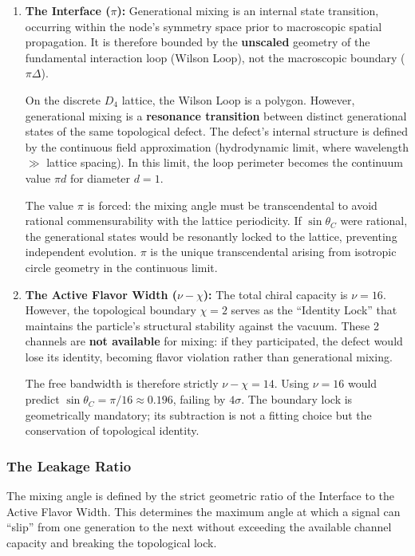 \begin{enumerate}
    \item \textbf{The Interface ($\pi$):} Generational mixing is an internal state transition, occurring within the node's symmetry space prior to macroscopic spatial propagation. It is therefore bounded by the \textbf{unscaled} geometry of the fundamental interaction loop (Wilson Loop), not the macroscopic boundary ($\pi\Delta$).

    On the discrete $D_4$ lattice, the Wilson Loop is a polygon. However, generational mixing is a \textbf{resonance transition} between distinct generational states of the same topological defect. The defect's internal structure is defined by the continuous field approximation (hydrodynamic limit, where wavelength $\gg$ lattice spacing). In this limit, the loop perimeter becomes the continuum value $\pi d$ for diameter $d=1$.

    The value $\pi$ is forced: the mixing angle must be transcendental to avoid rational commensurability with the lattice periodicity. If $\sin\theta_C$ were rational, the generational states would be resonantly locked to the lattice, preventing independent evolution. $\pi$ is the unique transcendental arising from isotropic circle geometry in the continuous limit.

    \item \textbf{The Active Flavor Width ($\nu - \chi$):} The total chiral capacity is $\nu=16$. However, the topological boundary $\chi=2$ serves as the ``Identity Lock'' that maintains the particle's structural stability against the vacuum. These 2 channels are \textbf{not available} for mixing: if they participated, the defect would lose its identity, becoming flavor violation rather than generational mixing.

    The free bandwidth is therefore strictly $\nu - \chi = 14$. Using $\nu = 16$ would predict $\sin\theta_C = \pi/16 \approx 0.196$, failing by $4\sigma$. The boundary lock is geometrically mandatory; its subtraction is not a fitting choice but the conservation of topological identity.
\end{enumerate}

\subsubsection{The Leakage Ratio}
The mixing angle is defined by the strict geometric ratio of the Interface to the Active Flavor Width. This determines the maximum angle at which a signal can ``slip'' from one generation to the next without exceeding the available channel capacity and breaking the topological lock. 

